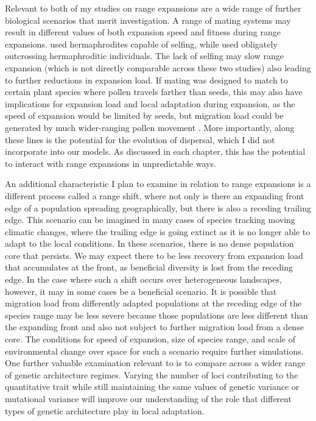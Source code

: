 Relevant to both of my studies on range expansions are a wide range of further biological scenarios that merit investigation. A range of mating systems may result in different values of both expansion speed and fitness during range expansions.  used hermaphrodites capable of selfing, while  used obligately outcrossing hermaphroditic individuals. The lack of selfing may slow range expansion (which is not directly comparable across these two studies) also leading to further reductions in expansion load. If mating was designed to match to certain plant species where pollen travels farther than seeds, this may also have implications for expansion load and local adaptation during expansion, as the speed of expansion would be limited by seeds, but migration load could be generated by much wider-ranging pollen movement \citep{Lopez:2008}. More importantly, along these lines is the potential for the evolution of dispersal, which I did not incorporate into our models. As discussed in each chapter, this has the potential to interact with range expansions in unpredictable ways.

An additional characteristic I plan to examine in relation to range expansions is a different process called a range shift, where not only is there an expanding front edge of a population spreading geographically, but there is also a receding trailing edge. This scenario can be imagined in many cases of species tracking moving climatic changes, where the trailing edge is going extinct as it is no longer able to adapt to the local conditions. In these scenarios, there is no dense population core that persists. We may expect there to be less recovery from expansion load that accumulates at the front, as beneficial diversity is lost from the receding edge. In the case where such a shift occurs over heterogeneous landscapes, however, it may in some cases be a beneficial scenario. It is possible that migration load from differently adapted populations at the receding edge of the species range may be less severe because those populations are less different than the expanding front and also not subject to further migration load from a dense core. The conditions for speed of expansion, size of species range, and scale of environmental change over space for such a scenario require further simulations. One further valuable examination relevant to  is to compare across a wider range of genetic architecture regimes. Varying the number of loci contributing to the quantitative trait while still maintaining the same values of genetic variance or mutational variance will improve our understanding of the role that different types of genetic architecture play in local adaptation.

